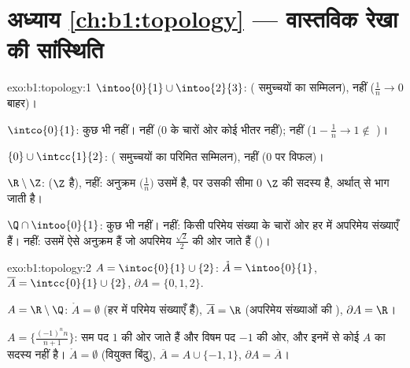 \section*{अध्याय \ref{ch:b1:topology} --- वास्तविक रेखा की सांस्थिति}

\begin{solution}{exo:b1:topology:1}
$\intoo{0}{1} \cup \intoo{2}{3}$:  ( समुच्चयों का सम्मिलन), 
नहीं ($\frac 1n \to 0$ बाहर)।

$\intco{0}{1}$: कुछ भी नहीं।  नहीं ($0$ के चारों ओर कोई  भीतर
नहीं);  नहीं ($1 - \frac1n \to 1 \notin$ )।

$\{0\} \cup \intcc{1}{2}$:  ( समुच्चयों का परिमित सम्मिलन), 
नहीं ($0$ पर विफल)।

$\R \setminus \Z$:  ($\Z$  है),  नहीं: अनुक्रम $\bigl(\frac
1n\bigr)$ उसमें है, पर उसकी सीमा $0$ $\Z$ की सदस्य है, अर्थात्  से
भाग जाती है।

$\Q \cap \intoo{0}{1}$: कुछ भी नहीं।  नहीं: किसी परिमेय संख्या के चारों
ओर हर  में अपरिमेय संख्याएँ हैं।  नहीं: उसमें ऐसे अनुक्रम हैं जो
अपरिमेय $\frac{\sqrt 2}{2}$ की ओर जाते हैं ()।
\end{solution}

\begin{solution}{exo:b1:topology:2}
$A = \intoc{0}{1} \cup \{2\}$: $\mathring A = \intoo{0}{1}$,
$\overline A = \intcc{0}{1} \cup \{2\}$, $\partial A = \{0, 1, 2\}$.

$A = \R \setminus \Q$: $\mathring A = \emptyset$ (हर  में परिमेय
संख्याएँ हैं), $\overline A = \R$ (अपरिमेय संख्याओं की ), $\partial A =
\R$।

$A = \bigl\{\frac{(-1)^n n}{n+1}\bigr\}$: सम पद $1$ की ओर जाते हैं और विषम
पद $-1$ की ओर, और इनमें से कोई $A$ का सदस्य नहीं है। $\mathring A =
\emptyset$ (वियुक्त बिंदु), $\overline A = A \cup \{-1, 1\}$, $\partial A =
\overline A$।
\end{solution}

